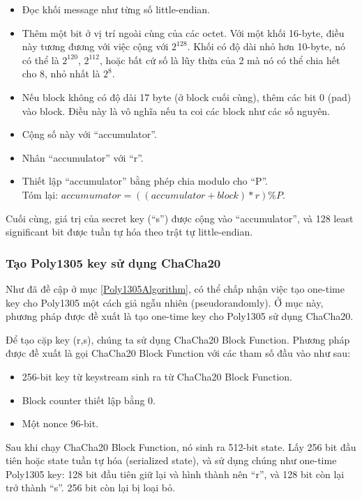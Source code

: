 \begin{itemize}
    \item Đọc khối message như từng số little-endian.
    \item Thêm một bit ở vị trí ngoài cùng của các octet. Với một khối 16-byte, điều này tương đương với việc cộng với $2^{128}$. Khối có độ dài nhỏ hơn 10-byte, nó có thể là $2^{120}$, $2^{112}$, hoặc bất cứ số là lũy thừa của 2 mà nó có thể chia hết cho 8, nhỏ nhất là $2^8$.
    \item Nếu block không có độ dài 17 byte (ở block cuối cùng), thêm các bit 0 (pad) vào block. Điều này là vô nghĩa nếu ta coi các block như các số nguyên.
    \item Cộng số này với ``accumulator''.
    \item Nhân ``accumulator'' với ``r''.
    \item Thiết lập ``accumulator'' bằng phép chia modulo cho ``P''. \\Tóm lại: $accumumator = ((accumulator+block)*r) \% P$.
\end{itemize}

Cuối cùng, giá trị của secret key (``s'') được cộng vào ``accumulator'',  và 128 least significant bit được tuần tự hóa theo trật tự little-endian.

\subsubsection{Tạo Poly1305 key sử dụng ChaCha20}
\label{CreatePoly1305UsingChaCha20}

Như đã đề cập ở mục \ref{Poly1305Algorithm}, có thể chấp nhận việc tạo one-time key cho Poly1305 một cách giả ngẫu nhiên (pseudorandomly). Ở mục này, phương pháp được đề xuất là tạo one-time key cho Poly1305 sử dụng ChaCha20.

Để tạo cặp key (r,s), chúng ta sử dụng ChaCha20 Block Function. Phương pháp được đề xuất là gọi ChaCha20 Block Function với các tham số đầu vào như sau:

\begin{itemize}
    \item 256-bit key từ keystream sinh ra từ ChaCha20 Block Function.
    \item Block counter thiết lập bằng 0.
    \item Một nonce 96-bit.
\end{itemize}

Sau khi chạy ChaCha20 Block Function, nó sinh ra 512-bit state. Lấy 256 bit đầu tiên hoặc state tuần tự hóa (serialized state), và sử dụng chúng như one-time Poly1305 key: 128 bit đầu tiên giữ lại và hình thành nên ``r'', và 128 bit còn lại trở thành ``s''. 256 bit còn lại bị loại bỏ.

